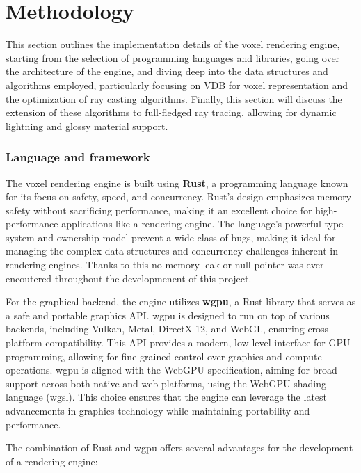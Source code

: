
\part{Methodology}\label{methodology}
This section outlines the implementation details of the voxel rendering engine, starting from the selection of programming languages and libraries, going over the architecture of the engine, and diving deep into the data structures and algorithms employed, particularly focusing on VDB for voxel representation and the optimization of ray casting algorithms.
Finally, this section will discuss the extension of these algorithms to full-fledged ray tracing, allowing for dynamic lightning and glossy material support.

\section{Language and framework}

The voxel rendering engine is built using \textbf{Rust}, a programming language known for its focus on safety, speed, and concurrency\supercite{rustbook}.
Rust's design emphasizes memory safety without sacrificing performance, making it an excellent choice for high-performance applications like a rendering engine.
The language's powerful type system and ownership model prevent a wide class of bugs, making it ideal for managing the complex data structures and concurrency challenges inherent in rendering engines. Thanks to this no memory leak or null pointer was ever encoutered throughout the developmenent of this project.

For the graphical backend, the engine utilizes \textbf{wgpu}\supercite{wgpu:doc}, a Rust library that serves as a safe and portable graphics API. wgpu is designed to run on top of various backends, including Vulkan, Metal, DirectX 12, and WebGL, ensuring cross-platform compatibility. This API provides a modern, low-level interface for GPU programming, allowing for fine-grained control over graphics and compute operations. wgpu is aligned with the WebGPU specification\supercite{webgpu:doc}, aiming for broad support across both native and web platforms, using the WebGPU shading language (wgsl)\supercite{wgsl:doc}. This choice ensures that the engine can leverage the latest advancements in graphics technology while maintaining portability and performance.

The combination of Rust and wgpu offers several advantages for the development of a rendering engine:


